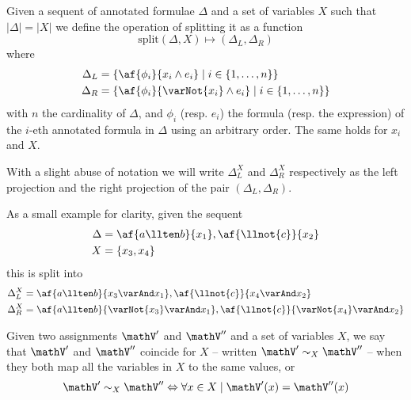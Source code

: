 \begin{define}[Splitting]
	\label{def:split}
	Given a sequent of annotated formulae $\Delta$ and a set of variables $X$ such that $|\Delta| = |X|$ we define the operation of splitting it as a function
	$$ \mathrm{split}(\Delta, X) \mapsto (\Delta_L, \Delta_R) $$
	where
	\begin{align*}
		\Delta_L &= \{ \af{\phi_i}{x_i \wedge e_i} \mid i \in \{1, \dots, n\}\} \\
		\Delta_R &= \{ \af{\phi_i}{\varNot{x_i} \wedge e_i} \mid i \in \{1, \dots, n\}\}
	\end{align*}
	with $n$ the cardinality of $\Delta$, and $\phi_i$ (resp. $e_i$) the formula (resp. the expression) of the $i$-eth annotated formula in $\Delta$ using an arbitrary order.
	The same holds for $x_i$ and $X$.

	\noindent With a slight abuse of notation we will write $\Delta_L^X$ and $\Delta_R^X$ respectively as the left projection and the right projection of the pair $(\Delta_L, \Delta_R)$.
\end{define}
As a small example for clarity, given the sequent
\begin{align*}
	\Delta &= \af{a \llten b}{x_1}, \af{\llnot{c}}{x_2} \\
	X      &= \{ x_3, x_4 \} 
\end{align*}
this is split into
\begin{align*}
	\Delta_L^X &= \af{a \llten b}{x_3 \varAnd x_1}, \af{\llnot{c}}{x_4 \varAnd x_2} \\
	\Delta_R^X &= \af{a \llten b}{\varNot{x_3} \varAnd x_1}, \af{\llnot{c}}{\varNot{x_4} \varAnd x_2} 
\end{align*}

\begin{define}
	Given two assignments $\mathV'$ and $\mathV''$ and a set of variables $X$, we say that $\mathV'$ and $\mathV''$ coincide for $X$ -- written $\mathV' \sim_X \mathV''$ -- when they both map all the variables in $X$ to the same values, or
	$$ \mathV' \sim_X \mathV'' \Leftrightarrow \forall x \in X \mid \mathV'(x) = \mathV''(x) $$
\end{define}

